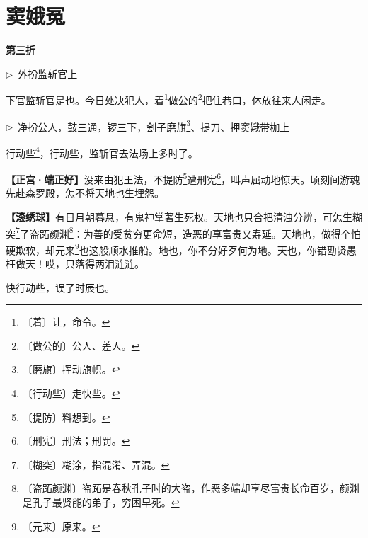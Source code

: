 \documentclass[12pt,UTF-8,openany]{ctexbook}
\renewcommand{\footnotesize}{\fontsize{8.5pt}{10.5pt}\selectfont}
\begin{document}
\chapter{窦娥冤}

\begin{normalsize}
    
    \begin{center}\textbf{第三折}\end{center}
    
    \noindent $\triangleright$~外扮监斩官上
    
    \begin{description}[itemsep=1ex,leftmargin=3.5em,labelwidth=3em]
    
    \item[{\color{script-5-0} 监斩官}]下官监斩官是也。今日处决犯人，着\footnote{〔着〕让，命令。}做公的\footnote{〔做公的〕公人、差人。}把住巷口，休放往来人闲走。
    
    \end{description}
    
    \noindent $\triangleright$~净扮公人，鼓三通，锣三下，刽子磨旗\footnote{〔磨旗〕挥动旗帜。}、提刀、押窦娥带枷上
    
    \begin{description}[itemsep=1ex,leftmargin=3.5em,labelwidth=3em]
    
    \item[{\color{script-5-1} 刽子}]行动些\footnote{〔行动些〕走快些。}，行动些，监斩官去法场上多时了。
    
    \item[{\color{script-5-2} 窦娥}]{\footnotesize\textbf{【正宫·端正好】}}没来由犯王法，不提防\footnote{〔提防〕料想到。}遭刑宪\footnote{〔刑宪〕刑法；刑罚。}，叫声屈动地惊天。顷刻间游魂先赴森罗殿，怎不将天地也生埋怨。
    
    \item[{\color{script-5-2} 窦娥}]{\footnotesize\textbf{【滚绣球】}}有日月朝暮悬，有鬼神掌著生死权。天地也只合把清浊分辨，可怎生糊突\footnote{〔糊突〕糊涂，指混淆、弄混。}了盗跖颜渊\footnote{〔盗跖颜渊〕盗跖是春秋孔子时的大盗，作恶多端却享尽富贵长命百岁，颜渊是孔子最贤能的弟子，穷困早死。 }：为善的受贫穷更命短，造恶的享富贵又寿延。天地也，做得个怕硬欺软，却元来\footnote{〔元来〕原来。}也这般顺水推船。地也，你不分好歹何为地。天也，你错勘贤愚枉做天！哎，只落得两泪涟涟。
    
    \item[{\color{script-5-1} 刽子}]快行动些，误了时辰也。
    

\end{description}
\end{normalsize}
\end{document}

